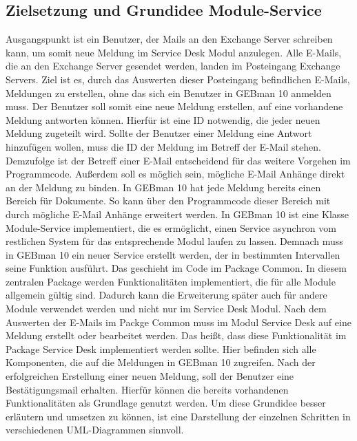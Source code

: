 \subsection{Zielsetzung und Grundidee Module-Service }
\noindent
Ausgangspunkt ist ein Benutzer, der Mails an den Exchange Server schreiben kann, um somit neue Meldung im Service Desk Modul anzulegen. Alle E-Mails, die an den Exchange Server gesendet werden, landen im Posteingang Exchange Servers. Ziel ist es, durch das Auswerten dieser Posteingang befindlichen E-Mails, Meldungen zu erstellen, ohne das sich ein Benutzer in GEBman 10 anmelden muss. Der Benutzer soll somit eine neue Meldung erstellen, auf eine vorhandene Meldung antworten können. Hierfür ist eine ID notwendig, die jeder neuen Meldung zugeteilt wird. Sollte der Benutzer einer Meldung eine Antwort hinzufügen wollen, muss die ID der Meldung im Betreff der E-Mail stehen. Demzufolge ist der Betreff einer E-Mail entscheidend für das weitere Vorgehen im Programmcode. Außerdem soll es möglich sein, mögliche E-Mail Anhänge direkt an der Meldung zu binden. In GEBman 10 hat jede Meldung bereits einen Bereich für Dokumente. So kann über den Programmcode dieser Bereich mit durch mögliche E-Mail Anhänge erweitert werden. \newline 
In GEBman 10 ist eine Klasse Module-Service implementiert, die es ermöglicht, einen Service asynchron vom restlichen System für das entsprechende Modul laufen zu lassen. Demnach muss in GEBman 10 ein neuer Service erstellt werden, der in bestimmten Intervallen seine Funktion ausführt. Das geschieht im Code im Package Common. In diesem zentralen Package werden Funktionalitäten implementiert, die für alle Module allgemein gültig sind. Dadurch kann die Erweiterung später auch für andere Module verwendet werden und nicht nur im Service Desk Modul.\newline
Nach dem Auswerten der E-Mails im Packge Common muss im Modul Service Desk auf eine Meldung erstellt oder bearbeitet werden. Das heißt, dass diese Funktionalität im Package Service Desk implementiert werden sollte. Hier befinden sich alle Komponenten, die auf die Meldungen in GEBman 10 zugreifen. Nach der erfolgreichen Erstellung einer neuen Meldung, soll der Benutzer eine Bestätigungsmail erhalten. Hierfür können die bereits vorhandenen Funktionalitäten als Grundlage genutzt werden.\newline
Um diese Grundidee besser erläutern und umsetzen zu können, ist eine Darstellung der einzelnen Schritten in verschiedenen UML-Diagrammen sinnvoll.

